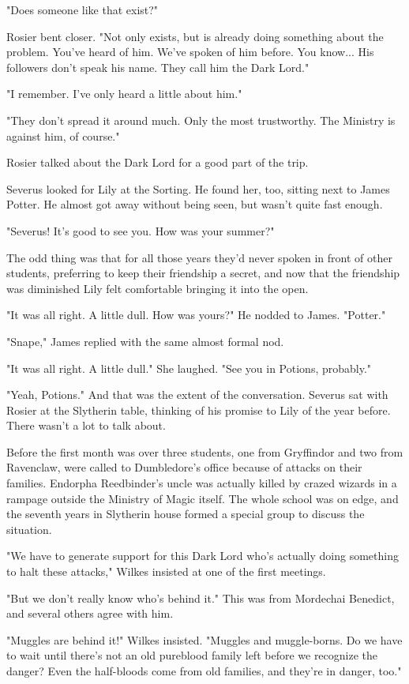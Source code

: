 \documentclass[a4paper,11pt]{article}
\begin{document}
"Does someone like that exist?"

Rosier bent closer. "Not only exists, but is already doing something about the problem. You've heard of him. We've spoken of him before. You know... His followers don't speak his name. They call him the Dark Lord."

"I remember. I've only heard a little about him."

"They don't spread it around much. Only the most trustworthy. The Ministry is against him, of course."

Rosier talked about the Dark Lord for a good part of the trip.

Severus looked for Lily at the Sorting. He found her, too, sitting next to James Potter. He almost got away without being seen, but wasn't quite fast enough.

"Severus! It's good to see you. How was your summer?"

The odd thing was that for all those years they'd never spoken in front of other students, preferring to keep their friendship a secret, and now that the friendship was diminished Lily felt comfortable bringing it into the open.

"It was all right. A little dull. How was yours?" He nodded to James. "Potter."

"Snape," James replied with the same almost formal nod.

"It was all right. A little dull." She laughed. "See you in Potions, probably."

"Yeah, Potions." And that was the extent of the conversation. Severus sat with Rosier at the Slytherin table, thinking of his promise to Lily of the year before. There wasn't a lot to talk about.

Before the first month was over three students, one from Gryffindor and two from Ravenclaw, were called to Dumbledore's office because of attacks on their families. Endorpha Reedbinder's uncle was actually killed by crazed wizards in a rampage outside the Ministry of Magic itself. The whole school was on edge, and the seventh years in Slytherin house formed a special group to discuss the situation.

"We have to generate support for this Dark Lord who's actually doing something to halt these attacks," Wilkes insisted at one of the first meetings.

"But we don't really know who's behind it." This was from Mordechai Benedict, and several others agree with him.

"Muggles are behind it!" Wilkes insisted. "Muggles and muggle-borns. Do we have to wait until there's not an old pureblood family left before we recognize the danger? Even the half-bloods come from old families, and they're in danger, too."
\end{document}
